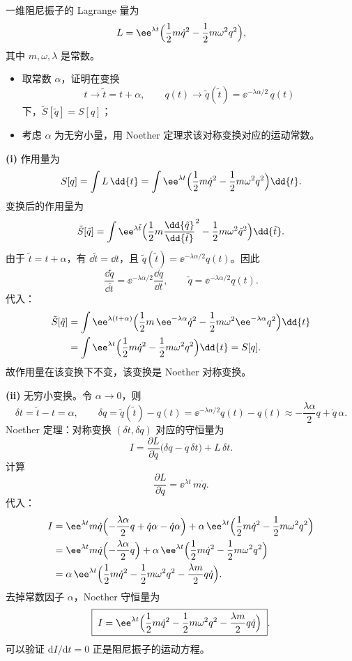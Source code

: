 \begin{question}
一维阻尼振子的 Lagrange 量为
\[
L = \ee^{\lambda t}\Bigl(\frac12 m\dot q^2 - \frac12 m\omega^2 q^2\Bigr),
\]
其中 \(m,\omega,\lambda\) 是常数。
\begin{itemize}
  \item[\textup{(i)}] 取常数 \(\alpha\)，证明在变换
  \[
  t \to \tilde t = t + \alpha,\qquad
  q(t) \to \tilde q(\tilde t) = \ee^{-\lambda\alpha/2}\, q(t)
  \]
  下，\(\tilde S[\tilde q] = S[q]\)；
  \item[\textup{(ii)}] 考虑 \(\alpha\) 为无穷小量，用 Noether 定理求该对称变换对应的运动常数。
\end{itemize}
\begin{solution}
\textbf{(i)} 作用量为
\[
S[q] = \int L\,\dd{t}
= \int \ee^{\lambda t}\Bigl(\frac12 m\dot q^2 - \frac12 m\omega^2 q^2\Bigr)\dd{t} .
\]
变换后的作用量为
\[
\tilde S[\tilde q] = \int \ee^{\lambda\tilde t}
\Bigl(\frac12 m\frac{\dd{\tilde q}}{\dd{\tilde t}}^2
- \frac12 m\omega^2 \tilde q^2\Bigr)\dd{\tilde t} .
\]
由于 \(\tilde t = t + \alpha\)，有 \(\dd{\tilde t} = \dd{t}\)，且 \(\tilde q(\tilde t) = \ee^{-\lambda\alpha/2} q(t)\)。因此
\[
\frac{\dd{\tilde q}}{\dd{\tilde t}}
= \ee^{-\lambda\alpha/2}\frac{\dd{q}}{\dd{t}},
\qquad
\tilde q = \ee^{-\lambda\alpha/2} q(t) .
\]
代入：
\begin{align*}
\tilde S[\tilde q]
&= \int \ee^{\lambda(t+\alpha)}\Bigl(
\frac12 m\, \ee^{-\lambda\alpha}\dot q^2
- \frac12 m\omega^2 \ee^{-\lambda\alpha} q^2\Bigr)\dd{t} \\
&= \int \ee^{\lambda t}\Bigl(\frac12 m\dot q^2 - \frac12 m\omega^2 q^2\Bigr)\dd{t}
= S[q] .
\end{align*}
故作用量在该变换下不变，该变换是 Noether 对称变换。

\textbf{(ii)} 无穷小变换。令 \(\alpha \to 0\)，则
\[
\delta t = \tilde t - t = \alpha,\qquad
\delta q = \tilde q(\tilde t) - q(t) = \ee^{-\lambda\alpha/2} q(t) - q(t)
\approx -\frac{\lambda\alpha}{2} q + \dot q\,\alpha .
\]
Noether 定理：对称变换 \((\delta t,\delta q)\) 对应的守恒量为
\[
I = \frac{\partial L}{\partial\dot q}\bigl(\delta q - \dot q\,\delta t\bigr) + L\,\delta t .
\]
计算
\[
\frac{\partial L}{\partial\dot q} = \ee^{\lambda t}\, m\dot q .
\]
代入：
\begin{align*}
I &= \ee^{\lambda t} m\dot q\Bigl(-\frac{\lambda\alpha}{2} q + \dot q\alpha - \dot q\alpha\Bigr)
+ \alpha\, \ee^{\lambda t}\Bigl(\frac12 m\dot q^2 - \frac12 m\omega^2 q^2\Bigr) \\
&= \ee^{\lambda t} m\dot q\Bigl(-\frac{\lambda\alpha}{2} q\Bigr)
+ \alpha\, \ee^{\lambda t}\Bigl(\frac12 m\dot q^2 - \frac12 m\omega^2 q^2\Bigr) \\
&= \alpha\, \ee^{\lambda t}\Bigl(\frac12 m\dot q^2 - \frac12 m\omega^2 q^2
- \frac{\lambda m}{2} q\dot q\Bigr).
\end{align*}
去掉常数因子 \(\alpha\)，Noether 守恒量为
\[
\boxed{\;I = \ee^{\lambda t}\Bigl(\frac12 m\dot q^2 - \frac12 m\omega^2 q^2
- \frac{\lambda m}{2} q\dot q\Bigr)\;}.
\]
可以验证 \(\mathrm d I/\mathrm d t = 0\) 正是阻尼振子的运动方程。
\end{solution}
\end{question}

